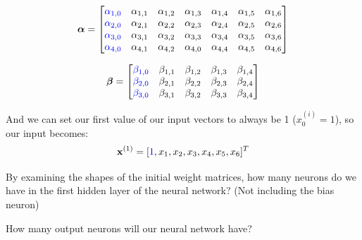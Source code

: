 \documentclass[11pt]{exam}
\numberwithin{equation}{section} %
\numberwithin{figure}{section} %
\numberwithin{table}{section} %
\newcommand{\xv}{\mathbf{x}}
\begin{document}
\begin{enumerate}
	$$\boldsymbol{\alpha}=
	    \begin{bmatrix}
	    \textcolor{blue}{\alpha_{1,0}} & \alpha_{1,1} & \alpha_{1,2} & \alpha_{1,3} & \alpha_{1,4} & \alpha_{1,5} & \alpha_{1,6} \\
	    \textcolor{blue}{\alpha_{2,0}} & \alpha_{2,1} & \alpha_{2,2} & \alpha_{2,3} & \alpha_{2,4} & \alpha_{2,5} & \alpha_{2,6} \\
	    \textcolor{blue}{\alpha_{3,0}} & \alpha_{3,1} & \alpha_{3,2} & \alpha_{3,3} & \alpha_{3,4} & \alpha_{3,5} & \alpha_{3,6} \\
	    \textcolor{blue}{\alpha_{4,0}} & \alpha_{4,1} & \alpha_{4,2} & \alpha_{4,0} & \alpha_{4,4} & \alpha_{4,5} & \alpha_{4,6}
	    \end{bmatrix}$$
	    
	$$\boldsymbol{\beta}=
	    \begin{bmatrix}
	    \textcolor{blue}{\beta_{1,0}} & \beta_{1,1} & \beta_{1,2} & \beta_{1,3} & \beta_{1,4} \\
	    \textcolor{blue}{\beta_{2,0}} & \beta_{2,1} & \beta_{2,2} & \beta_{2,3} & \beta_{2,4} \\
	    \textcolor{blue}{\beta_{3,0}} & \beta_{3,1} & \beta_{3,2} & \beta_{3,3} & \beta_{3,4}
	    \end{bmatrix}$$
	
	    And we can set our first value of our input vectors to always be 1 ($x_0^{(i)} = 1$), so our input becomes: $$\xv^{(1)}=[\textcolor{blue}{1},x_1,x_2,x_3,x_4,x_5,x_6]^T$$
	    
	    
	    \begin{questions}
	        \question[1] By examining the shapes of the initial weight matrices, how many neurons do we have in the first hidden layer of the neural network? (Not including the bias neuron)
	        
	        \begin{tcolorbox}[fit,height=1cm, width=2cm, blank, borderline={1pt}{-2pt}]
	        \end{tcolorbox}
	        
	        
	        
	        
	        \question[1] How many output neurons will our neural network have?
	        
	        \begin{tcolorbox}[fit,height=1cm, width=2cm, blank, borderline={1pt}{-2pt}]
	        \end{tcolorbox}
	        

\end{questions}
\end{enumerate}
\end{document}

